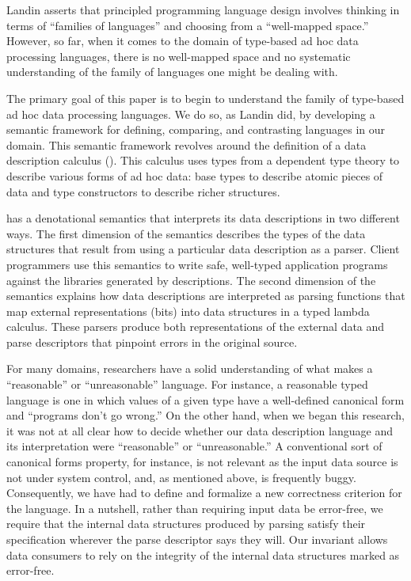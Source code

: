Landin asserts that principled programming language design
involves thinking in terms of ``families of languages'' and
choosing from a ``well-mapped space.''  However, so far,
when it comes to the domain of type-based ad hoc data processing languages, 
there is no well-mapped space and no systematic understanding
of the family of languages one might be dealing with.

The primary goal of this paper is to begin to understand the
family of type-based ad hoc data processing languages.  We do so,
as Landin did, by developing a semantic
framework for defining, comparing, and contrasting languages
in our domain.  This semantic framework revolves around the
definition of a data description calculus (\ddc{}).  
This calculus uses types from a dependent type theory to describe
various forms of ad hoc data:
base types to describe atomic pieces of data and
type constructors to describe richer structures.

\ddc{} has a denotational semantics
that interprets its data descriptions in two different
ways.  The first dimension of the semantics describes the
types of the data structures that result from using a particular
data description as a parser.  Client programmers use this semantics to
write safe, well-typed application programs against the libraries
generated by \ddc{} descriptions.  The second dimension of the semantics
explains how data descriptions are
interpreted as parsing functions that map external representations (bits)
into data structures in a typed lambda calculus.  These parsers produce both 
representations of the external data and
parse descriptors that pinpoint errors in the original source.



For many domains, researchers have a solid understanding of
what makes a ``reasonable'' or ``unreasonable'' language.  For instance,
a reasonable typed language is one in which values of a given type
have a well-defined canonical form and ``programs don't go wrong.''
On the other hand, when we began this research, it
was not at all clear
how to decide whether our data description language and
its interpretation were ``reasonable'' or ``unreasonable.''  
A conventional sort
of canonical forms property, for instance, 
is not relevant as the input data source
is not under system control, and, as
mentioned above, is frequently buggy.  Consequently,
we have had to define and formalize a new correctness criterion 
for the language. 
In a nutshell, rather than requiring input data be error-free, we require
that the internal data structures produced by parsing 
satisfy their specification wherever the parse descriptor says they
will.  Our invariant allows
data consumers to rely on the integrity of the internal data structures
marked as error-free. 

